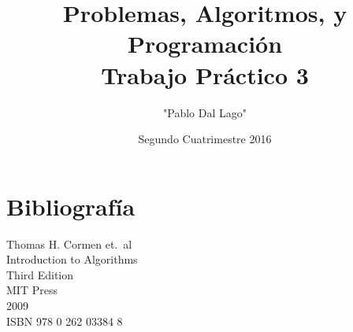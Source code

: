 \documentclass{article}
\title{Problemas, Algoritmos, y Programación \\ Trabajo Práctico 3}
\author{"Pablo Dal Lago"}
\date{Segundo Cuatrimestre 2016}
\begin{document}
\maketitle{}

\newpage
\tableofcontents






\section{Bibliografía}

\begin{thebibliography}{9}

	Thomas H. Cormen et.\ al \\
	Introduction to Algorithms \\
	Third Edition \\
	MIT Press \\
	2009 \\
	ISBN 978 0 262 03384 8

\end{thebibliography}
\end{document}
